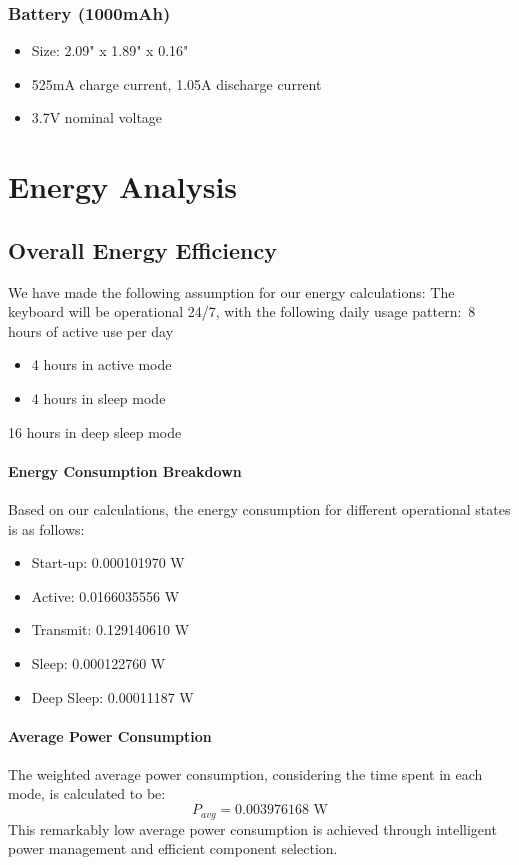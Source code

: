 \documentclass[a4paper,11pt]{article}%
\begin{document}
\subsubsection{Battery (1000mAh)}
\begin{itemize}
    \item Size: 2.09" x 1.89" x 0.16"
    \item 525mA charge current, 1.05A discharge current
    \item 3.7V nominal voltage
\end{itemize}


\section{Energy Analysis}
\subsection{Overall Energy Efficiency}
We have made the following assumption for our energy calculations:
The keyboard will be operational 24/7, with the following daily usage pattern:\
8 hours of active use per day
\begin{itemize}
\item 4 hours in active mode
\item 4 hours in sleep mode
\end{itemize}
16 hours in deep sleep mode
\paragraph{Energy Consumption Breakdown}
Based on our calculations, the energy consumption for different operational states is as follows:
\begin{itemize}
\item Start-up: 0.000101970 W
\item Active: 0.0166035556 W
\item Transmit: 0.129140610 W
\item Sleep: 0.000122760 W
\item Deep Sleep: 0.00011187 W
\end{itemize}
\paragraph{Average Power Consumption}
The weighted average power consumption, considering the time spent in each mode, is calculated to be:
\begin{equation}
P_{avg} = 0.003976168 \text{ W}
\end{equation}
This remarkably low average power consumption is achieved through intelligent power management and efficient component selection.
\end{document}
